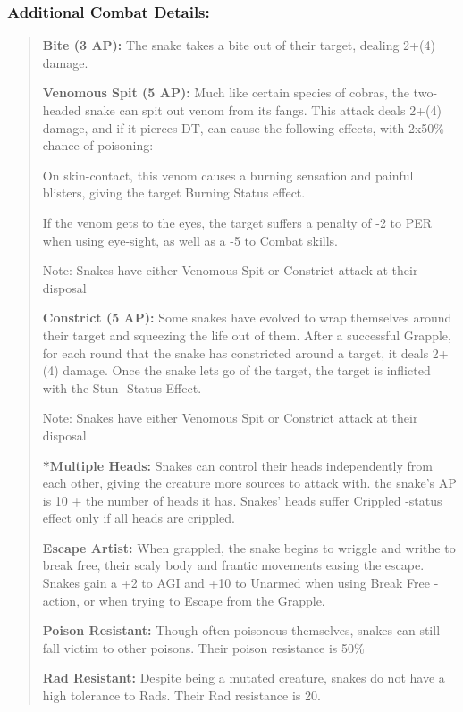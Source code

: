 \documentclass[11pt,a4paper,twocolumn]{book}
\begin{document}
	\subsubsection*{Additional Combat Details:}
	\begin{verse}
		\textbf{Bite (3 AP):} The snake takes a bite out of their target, dealing 2+(4) damage.
		
		\textbf{Venomous Spit (5 AP):} Much like certain species of cobras, the two-headed snake can spit out venom from its fangs. This attack deals 2+(4) damage, and if it pierces DT, can cause the following effects, with 2x50\% chance of poisoning: 
		\begin{compactitem}	
			\item On skin-contact, this venom causes a burning sensation and painful blisters, giving the target Burning Status effect. 
			
			\item If the venom gets to the eyes, the target suffers a penalty of -2 to PER when using eye-sight, as well as a -5 to Combat skills.
			
			\item Note: Snakes have either Venomous Spit or Constrict attack at their disposal
		\end{compactitem}
		\textbf{Constrict (5 AP):} Some snakes have evolved to wrap themselves around their target and squeezing the life out of them. After a successful Grapple, for each round that the snake has constricted around a target, it deals 2+(4) damage. Once the snake lets go of the target, the target is inflicted with the Stun- Status Effect.
		\begin{compactitem}	
			\item Note: Snakes have either Venomous Spit or Constrict attack at their disposal
		\end{compactitem}
		
		\textbf{*Multiple Heads:} Snakes can control their heads independently from each other, giving the creature more sources to attack with. the snake's AP is 10 + the number of heads it has. Snakes' heads suffer Crippled -status effect only if all heads are crippled.
		
		\textbf{Escape Artist:} When grappled, the snake begins to wriggle and writhe to break free, their scaly body and frantic movements easing the escape. Snakes gain a +2 to AGI and +10 to Unarmed when using Break Free -action, or when trying to Escape from the Grapple.
		
		\textbf{Poison Resistant:} Though often poisonous themselves, snakes can still fall victim to other poisons. Their poison resistance is 50\%
		
		\textbf{Rad Resistant:} Despite being a mutated creature, snakes do not have a high tolerance to Rads. Their Rad resistance is 20.
	\end{verse}
	
\end{document}

